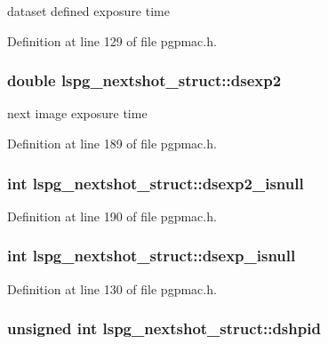 dataset defined exposure time 

Definition at line 129 of file pgpmac.h.\hypertarget{structlspg__nextshot__struct_a4d8c34309572875352ddabe9cc9001ee}{
\subsubsection[{dsexp2}]{\setlength{\rightskip}{0pt plus 5cm}double {\bf lspg\_\-nextshot\_\-struct::dsexp2}}}
\label{structlspg__nextshot__struct_a4d8c34309572875352ddabe9cc9001ee}


next image exposure time 

Definition at line 189 of file pgpmac.h.\hypertarget{structlspg__nextshot__struct_a45091283dc073e5b7da2cfbe5a75fade}{
\subsubsection[{dsexp2\_\-isnull}]{\setlength{\rightskip}{0pt plus 5cm}int {\bf lspg\_\-nextshot\_\-struct::dsexp2\_\-isnull}}}
\label{structlspg__nextshot__struct_a45091283dc073e5b7da2cfbe5a75fade}


Definition at line 190 of file pgpmac.h.\hypertarget{structlspg__nextshot__struct_ae07498f62ea9c0e2f702b78c87500794}{
\subsubsection[{dsexp\_\-isnull}]{\setlength{\rightskip}{0pt plus 5cm}int {\bf lspg\_\-nextshot\_\-struct::dsexp\_\-isnull}}}
\label{structlspg__nextshot__struct_ae07498f62ea9c0e2f702b78c87500794}


Definition at line 130 of file pgpmac.h.\hypertarget{structlspg__nextshot__struct_a5e260a420176f2973cdb100d0a5c4c09}{
\subsubsection[{dshpid}]{\setlength{\rightskip}{0pt plus 5cm}unsigned int {\bf lspg\_\-nextshot\_\-struct::dshpid}}}
\label{structlspg__nextshot__struct_a5e260a420176f2973cdb100d0a5c4c09}


